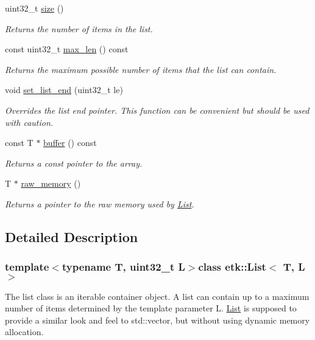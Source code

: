 \begin{DoxyCompactItemize}
uint32\-\_\-t \hyperlink{classetk_1_1_list_ab8069a0cace5704b066804f2493d3513}{size} ()
\begin{DoxyCompactList}\small\item\em Returns the number of items in the list. \end{DoxyCompactList}\item 
const uint32\-\_\-t \hyperlink{classetk_1_1_list_a9bbc7fefde677a9526060ee038257cc2}{max\-\_\-len} () const 
\begin{DoxyCompactList}\small\item\em Returns the maximum possible number of items that the list can contain. \end{DoxyCompactList}\item 
void \hyperlink{classetk_1_1_list_aa6cada6daf6b4cff8166782009ed5cdb}{set\-\_\-list\-\_\-end} (uint32\-\_\-t le)
\begin{DoxyCompactList}\small\item\em Overrides the list end pointer. This function can be convenient but should be used with caution. \end{DoxyCompactList}\item 
const T $\ast$ \hyperlink{classetk_1_1_list_a765da91f522c96c94efec3790b5a63b5}{buffer} () const 
\begin{DoxyCompactList}\small\item\em Returns a const pointer to the array. \end{DoxyCompactList}\item 
T $\ast$ \hyperlink{classetk_1_1_list_add87c29d6b7283b6329a01c3b1eae898}{raw\-\_\-memory} ()
\begin{DoxyCompactList}\small\item\em Returns a pointer to the raw memory used by \hyperlink{classetk_1_1_list}{List}. \end{DoxyCompactList}\end{DoxyCompactItemize}


\subsection{Detailed Description}
\subsubsection*{template$<$typename T, uint32\-\_\-t L$>$class etk\-::\-List$<$ T, L $>$}

The list class is an iterable container object. A list can contain up to a maximum number of items determined by the template parameter L. \hyperlink{classetk_1_1_list}{List} is supposed to provide a similar look and feel to std\-::vector, but without using dynamic memory allocation. 


